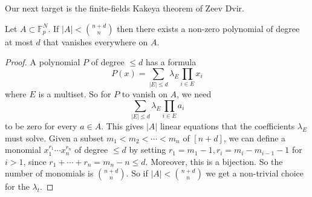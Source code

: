 \documentclass{article}
\newcommand{\1}[1]{\mathbbm{1}_{#1}}
\begin{document}
Our next target is the finite-fields Kakeya theorem of Zeev Dvir.
\begin{nlemma}\label{lem:4.5}
  Let $A \subset \mathbb{F}_p^N$.
  If $|A| < \binom{n + d}{n}$ then there exists a non-zero polynomial of degree at most $d$ that vanishes everywhere on $A$.
\end{nlemma}
\begin{proof}
  A polynomial $P$ of degree $\leq d$ has a formula
  \begin{equation*}
    P(x) = \sum_{|E| \leq d} \lambda_E \prod_{i \in E} x_i
  \end{equation*}
  where $E$ is a multiset. So for $P$ to vanish on $A$, we need
  \begin{equation*}
    \sum_{|E| \leq d} \lambda_E \prod_{i \in E} a_i
  \end{equation*}
  to be zero for every $a \in A$.
  This gives $|A|$ linear equations that the coefficients $\lambda_E$ must solve.
  Given a subset $m_1 < m_2 < \dotsb < m_n$ of $[n+d]$, we can define a monomial $x_1^{r_1} \dotsm x_n^{r_n}$ of degree $\leq d$ by setting $r_1 = m_1 - 1, r_i = m_i - m_{i-1} - 1$ for $i > 1$, since $r_1 + \dotsb + r_n = m_n - n \leq d$.
  Moreover, this is a bijection.
  So the number of monomials is $\binom{n+d}{n}$.
  So if $|A| < \binom{n+d}{n}$ we get a non-trivial choice for the $\lambda_t$.
\end{proof}
\end{document}
